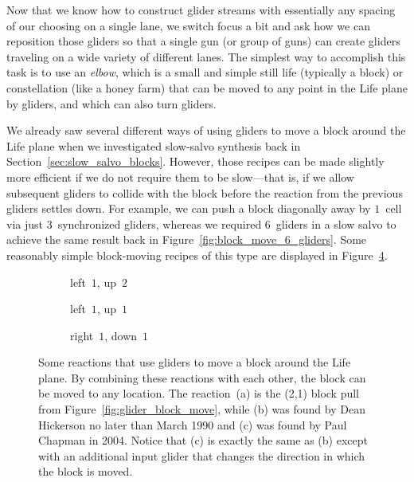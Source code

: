 Now that we know how to construct glider streams with essentially any spacing of our choosing on a single lane, we switch focus a bit and ask how we can reposition those gliders so that a single gun (or group of guns) can create gliders traveling on a wide variety of different lanes. The simplest way to accomplish this task is to use an \emph{elbow}, which is a small and simple still life (typically a block) or constellation (like a honey farm) that can be moved to any point in the Life plane by gliders, and which can also turn gliders.

We already saw several different ways of using gliders to move a block around the Life plane when we investigated slow-salvo synthesis back in Section~\ref{sec:slow_salvo_blocks}. However, those recipes can be made slightly more efficient if we do not require them to be slow---that is, if we allow subsequent gliders to collide with the block before the reaction from the previous gliders settles down. For example, we can push a block diagonally away by $1$~cell via just $3$~synchronized gliders, whereas we required $6$~gliders in a slow salvo to achieve the same result back in Figure~\ref{fig:block_move_6_gliders}. Some reasonably simple block-moving recipes of this type are displayed in Figure~\ref{fig:synchronized_block_movers}.

\begin{figure}[!htb]
	\centering
	\begin{subfigure}{0.3\textwidth}
		\centering
		\caption{left~$1$, up~$2$}
		\label{fig:synchronized_block_mover_1}
	\end{subfigure} \hfill \begin{subfigure}{.325\textwidth}
		\centering
					\caption{left~$1$, up~$1$}
		\label{fig:synchronized_block_mover_4}
	\end{subfigure} \hfill \begin{subfigure}{.325\textwidth}
		\centering
		\caption{right~$1$, down~$1$}
		\label{fig:synchronized_block_mover_5}
	\end{subfigure}
	\caption{Some reactions that use gliders to move a block around the Life plane. By combining these reactions with each other, the block can be moved to any location. The reaction~(a) is the (2,1) block pull from Figure~\ref{fig:glider_block_move}, while (b) was found by Dean Hickerson no later than March 1990 and (c) was found by Paul Chapman in 2004. Notice that (c) is exactly the same as (b) except with an additional input glider that changes the direction in which the block is moved.}\label{fig:synchronized_block_movers}
\end{figure}

